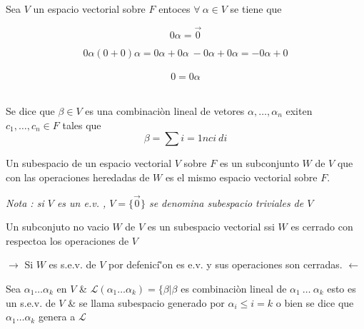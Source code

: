 		\begin{proposicion} Sea $V$ un espacio vectorial sobre $F$ entoces $\forall \ \alpha \in V$ se tiene que  
		
		\end{proposicion}
		 
		 \begin{equation}
		 0 \alpha = \overrightarrow{0} \nonumber
		 \end{equation}
		 
		 \begin{equation}
		 0 \alpha ( 0 + 0 ) \alpha = 0 \alpha + 0 \alpha \
		 - 0 \alpha + 0 \alpha = - 0 \alpha + 0 \nonumber
		 \end{equation}
			\\
		\begin{equation}
		0 = 0 \alpha \nonumber
		\end{equation}		
	\\	
		
	\begin{definicion}
	Se dice que $\beta \in V $ es una combinaci\`on lineal de vetores $\alpha , \dots , \alpha_n$ exiten $c_1, \dots , c_n \in F$ tales que
			\begin{equation}
				\beta = \sum\limits{i=1}{n} ci \ di \nonumber
			\end{equation}

	\end{definicion}

	\begin{definicion}	
Un subespacio de un espacio vectorial $V$ sobre $F$ es un subconjunto $W$ de $V$ que con las operaciones heredadas de $W$ es el mismo espacio vectorial sobre $F$.
		
	\end{definicion}	
\emph{Nota : si $V$ es un e.v. , $V=\{ \vec{0} \}$ se denomina subespacio triviales de $V$} 

\begin{proposicion}
 	Un subconjuto no vacio $W$ de $V$ es un subespacio vectorial ssi $W$ es cerrado con respectoa los operaciones de $V$
 \end{proposicion} 

 $\rightarrow$ Si $W$ es s.e.v. de $V$ por defenici\`'on es e.v. y sus operaciones son cerradas.
 $\leftarrow$ 

 
 
 \begin{definicion}
 	Sea $\alpha_1 \dots \alpha_k$ en $V$ \& $\mathcal{L}(\alpha_1 \dots \alpha_k)=\{ \beta	| \beta$ es combinaci\`on lineal de $\alpha_1 \ \dots \ \alpha_k$ esto es un s.e.v. de $V$ \& se llama subespacio generado por $\alpha_i \leq i = k$ o bien se dice que $\alpha_1 \dots \alpha_k$ genera a $\mathcal{L}$
 \end{definicion}

